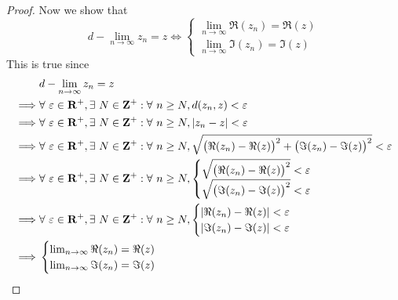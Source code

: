 \begin{proof}
    Now we show that
    \[
        d - \lim_{n \to \infty} z_n = z \iff \begin{cases}
            \lim_{n \to \infty} \Re(z_n) = \Re(z) \\
            \lim_{n \to \infty} \Im(z_n) = \Im(z)
        \end{cases}
    \]
    This is true since
    \begin{align*}
                 & d - \lim_{n \to \infty} z_n = z                                                                                                                                            \\
        \implies & \forall\ \varepsilon \in \mathbf{R}^+, \exists\ N \in \mathbf{Z}^+ : \forall\ n \geq N, d(z_n, z) < \varepsilon                                                            \\
        \implies & \forall\ \varepsilon \in \mathbf{R}^+, \exists\ N \in \mathbf{Z}^+ : \forall\ n \geq N, \abs*{z_n - z} < \varepsilon                                                       \\
        \implies & \forall\ \varepsilon \in \mathbf{R}^+, \exists\ N \in \mathbf{Z}^+ : \forall\ n \geq N, \sqrt{\big(\Re(z_n) - \Re(z)\big)^2 + \big(\Im(z_n) - \Im(z)\big)^2} < \varepsilon \\
        \implies & \forall\ \varepsilon \in \mathbf{R}^+, \exists\ N \in \mathbf{Z}^+ : \forall\ n \geq N, \begin{cases}
            \sqrt{\big(\Re(z_n) - \Re(z)\big)^2} < \varepsilon \\
            \sqrt{\big(\Im(z_n) - \Im(z)\big)^2} < \varepsilon
        \end{cases}                                                         \\
        \implies & \forall\ \varepsilon \in \mathbf{R}^+, \exists\ N \in \mathbf{Z}^+ : \forall\ n \geq N, \begin{cases}
            \abs*{\Re(z_n) - \Re(z)} < \varepsilon \\
            \abs*{\Im(z_n) - \Im(z)} < \varepsilon
        \end{cases}                                                         \\
        \implies & \begin{cases}
            \lim_{n \to \infty} \Re(z_n) = \Re(z) \\
            \lim_{n \to \infty} \Im(z_n) = \Im(z)
        \end{cases}
    \end{align*}

\end{proof}
